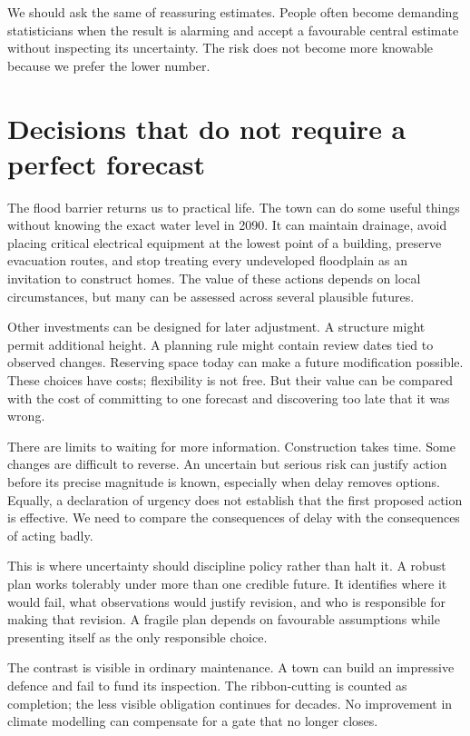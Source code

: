 \documentclass[12pt,a4paper]{book}
\begin{document}
We should ask the same of reassuring estimates. People often become demanding statisticians when the result is alarming and accept a favourable central estimate without inspecting its uncertainty. The risk does not become more knowable because we prefer the lower number.

\section*{Decisions that do not require a perfect forecast}

The flood barrier returns us to practical life. The town can do some useful things without knowing the exact water level in 2090. It can maintain drainage, avoid placing critical electrical equipment at the lowest point of a building, preserve evacuation routes, and stop treating every undeveloped floodplain as an invitation to construct homes. The value of these actions depends on local circumstances, but many can be assessed across several plausible futures.

Other investments can be designed for later adjustment. A structure might permit additional height. A planning rule might contain review dates tied to observed changes. Reserving space today can make a future modification possible. These choices have costs; flexibility is not free. But their value can be compared with the cost of committing to one forecast and discovering too late that it was wrong.

There are limits to waiting for more information. Construction takes time. Some changes are difficult to reverse. An uncertain but serious risk can justify action before its precise magnitude is known, especially when delay removes options. Equally, a declaration of urgency does not establish that the first proposed action is effective. We need to compare the consequences of delay with the consequences of acting badly.

This is where uncertainty should discipline policy rather than halt it. A robust plan works tolerably under more than one credible future. It identifies where it would fail, what observations would justify revision, and who is responsible for making that revision. A fragile plan depends on favourable assumptions while presenting itself as the only responsible choice.

The contrast is visible in ordinary maintenance. A town can build an impressive defence and fail to fund its inspection. The ribbon-cutting is counted as completion; the less visible obligation continues for decades. No improvement in climate modelling can compensate for a gate that no longer closes.
\end{document}
